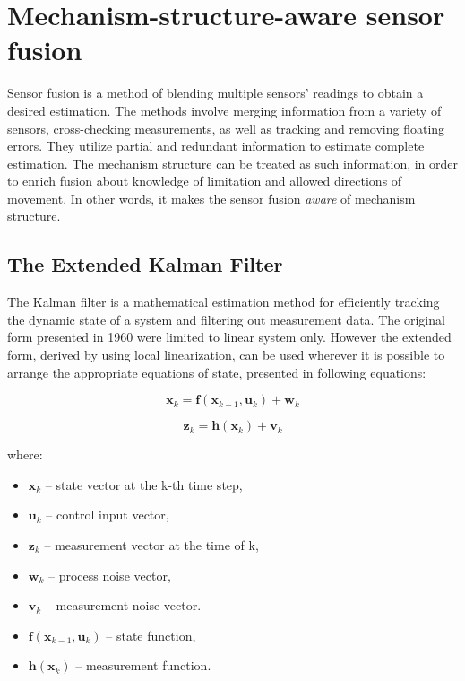 \section{Mechanism-structure-aware sensor fusion}

Sensor fusion is a method of blending multiple sensors’ readings to obtain a desired estimation. The methods involve merging information from a variety of sensors, cross-checking measurements, as well as tracking and removing floating errors. They utilize partial and redundant information to estimate complete estimation. The mechanism structure can be treated as such information, in order to enrich fusion about knowledge of limitation and allowed directions of movement. In other words, it makes the sensor fusion \textit{aware} of mechanism structure.


\subsection{The Extended Kalman Filter}

The Kalman filter is a mathematical estimation method for efficiently tracking the dynamic state of a system and filtering out measurement data. The original form presented in 1960 \cite{kalman} were limited to linear system only. However the extended form, derived by using local linearization, can be used wherever it is possible to
arrange the appropriate equations of state, presented in following equations:

\begin{equation}
	\bm{x}_k =  \bm{f} \left( \bm{x}_{k-1},  \bm{u}_k \right) + \bm{w}_k
	\label{ekf1}
\end{equation}

\begin{equation}
	\bm{z}_k = \bm{h} \left(\bm{x}_k \right) + \bm{v}_k
	\label{ekf2}
\end{equation}


where:
\begin{itemize}
	\item $\bm{x}_k$ -- state vector at the k-th time step,
	\item $\bm{u}_k$  -- control input vector, 
	\item $\bm{z}_k$  -- measurement vector at the time of k, 
	\item $\bm{w}_k$ -- process noise vector, 
	\item $\bm{v}_k$ -- measurement noise vector.
	\item $\bm{f} \left( \bm{x}_{k-1},  \bm{u}_k \right)$ -- state function, 
	\item $\bm{h} \left(\bm{x}_k \right)$ -- measurement function.
\end{itemize}

